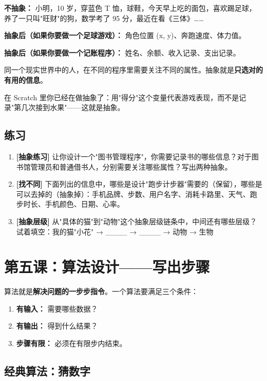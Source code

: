 \documentclass[a4paper,12pt]{ctexart}
\begin{document}
\noindent
\textbf{不抽象：} 小明，10 岁，穿蓝色 T 恤，球鞋，今天早上吃的面包，喜欢踢足球，养了一只叫"旺财"的狗，数学考了 95 分，最近在看《三体》……

\textbf{抽象后（如果你要做一个足球游戏）：} 角色位置 (x, y)、奔跑速度、体力值。

\textbf{抽象后（如果你要做一个记账程序）：} 姓名、余额、收入记录、支出记录。

同一个现实世界中的人，在不同的程序里需要关注不同的属性。抽象就是\textbf{只选对的有用的信息}。

在 Scratch 里你已经在做抽象了：用"得分"这个变量代表游戏表现，而不是记录"第几次接到水果"——这就是抽象。

\subsection*{练习}

\begin{enumerate}
  \item \textbf{[抽象练习]} 让你设计一个"图书管理程序"，你需要记录书的哪些信息？对于图书馆管理员和普通借书人，分别需要关注哪些属性？写出两种抽象。
  \item \textbf{[找不同]} 下面列出的信息中，哪些是设计"跑步计步器"需要的（保留），哪些是可以去掉的（抽象掉）：手机品牌、步数、用户名字、消耗卡路里、天气、跑步时长、手机颜色、日期、心率。
  \item \textbf{[抽象层级]} 从"具体的猫"到"动物"这个抽象层级链条中，中间还有哪些层级？试着填空：我的猫"小花" → \_\_\_\_ → \_\_\_\_ → 动物 → 生物
\end{enumerate}

\section*{第五课：算法设计——写出步骤}

算法就是\textbf{解决问题的一步步指令}。一个算法要满足三个条件：

\begin{enumerate}
  \item \textbf{有输入：} 需要哪些数据？
  \item \textbf{有输出：} 得到什么结果？
  \item \textbf{步骤有限：} 必须在有限步内结束。
\end{enumerate}

\subsection*{经典算法：猜数字}
\end{document}
